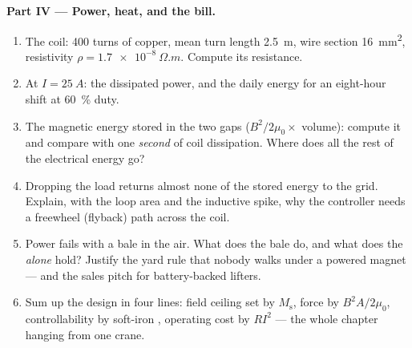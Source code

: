 \begin{problem}
\medskip\noindent\textbf{Part IV --- Power, heat, and the bill.}

\begin{enumerate}[resume]
  \item The coil: 400 turns of copper, mean turn length
        \qty{2.5}{m}, wire section \qty{16}{mm^2}, resistivity
        $\rho = \qty{1.7e-8}{\Omega.m}$. Compute its resistance.
  \item At $I = \qty{25}{A}$: the dissipated power, and the daily
        energy for an eight-hour shift at \qty{60}{\percent} duty.
  \item The magnetic energy stored in the two gaps
        ($B^2/2\mu_0 \times$ volume): compute it and compare with
        one \emph{second} of coil dissipation. Where does all the
        rest of the electrical energy go?
  \item Dropping the load returns almost none of the stored
        energy to the grid. Explain, with the loop area and the
        inductive spike, why the controller needs a freewheel
        (flyback) path across the coil.
  \item Power fails with a bale in the air. What does the bale
        do, and what does the  \emph{alone} hold? Justify
        the yard rule that nobody walks under a powered magnet ---
        and the sales pitch for battery-backed lifters.
  \item Sum up the design in four lines: field ceiling set by
        $M_{\text{s}}$, force by $B^2A/2\mu_0$, controllability by
        soft-iron , operating cost by $RI^2$ --- the
        whole chapter hanging from one crane.
\end{enumerate}
\end{problem}
